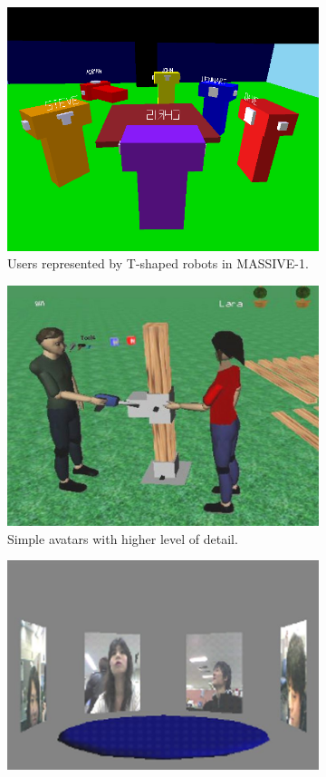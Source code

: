\begin{figure}[htb]
  \begin{subfigure}{.5\textwidth}
    \centering
    \includegraphics[width=0.9\linewidth]{figures/ch1/rep_avatar_low}
    \caption{Users represented by T-shaped robots in MASSIVE-1.}
    \label{fig:1_vrep:rep_avatar_low}
  \end{subfigure}
  \begin{subfigure}{.5\textwidth}
    \centering
    \includegraphics[width=0.9\linewidth]{figures/ch1/rep_avatar_high}
    \caption{Simple avatars with higher level of detail.}
    \label{fig:1_vrep:rep_avatar_high}
  \end{subfigure}
  \begin{subfigure}{.5\textwidth}
    \centering
    \includegraphics[width=0.9\linewidth]{figures/ch1/rep_billboard}

\end{subfigure}
\end{figure}
